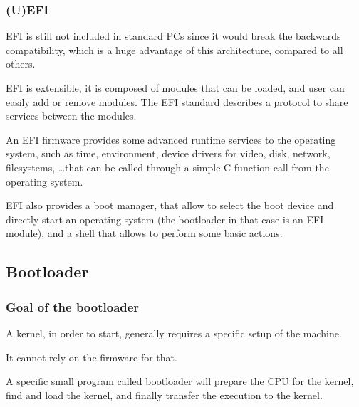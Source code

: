 \begin{frame}
  \frametitle{(U)EFI}

  EFI is still not included in standard PCs since it would break the backwards compatibility, which is a huge advantage of this architecture, compared to all others.

  \-

  EFI is extensible, it is composed of modules that can be loaded, and user can easily add or remove modules. The EFI standard describes a protocol to share services between the modules.
  
  \-

  An EFI firmware provides some advanced runtime services to the operating system, such as time, environment, device drivers for video, disk, network, filesystems, \ldots that can be called through a simple C function call from the operating system.

  \-

  EFI also provides a boot manager, that allow to select the boot device and directly start an operating system (the bootloader in that case is an EFI module), and a shell that allows to perform some basic actions.

\end{frame}

\subsection{Bootloader}

\begin{frame}
  \frametitle{Goal of the bootloader}

  A kernel, in order to start, generally requires a specific setup of the machine.

  \-

  It cannot rely on the firmware for that.

  \-

  A specific small program called bootloader will prepare the CPU for the kernel, find and load the kernel, and finally transfer the execution to the kernel.

  \-

\end{frame}

